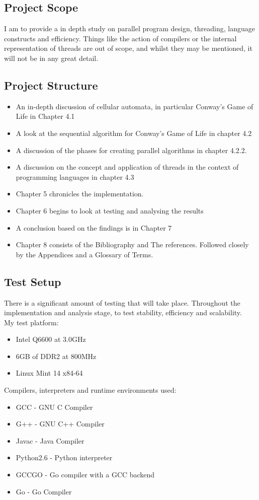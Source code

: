 \documentclass[11pt]{article} %
\begin{document}
\subsection{Project Scope}
I am to provide a in depth study on parallel program design, threading, language constructs and efficiency. Things like the action of compilers or the internal representation of threads are out of scope, and whilst they may be mentioned, it will not be in any great detail.
\subsection{Project Structure}
\begin{itemize}
\item An in-depth discussion of cellular automata, in particular Conway's Game of Life in Chapter 4.1
\item A look at the sequential algorithm for Conway's Game of Life in chapter 4.2
\item A discussion of the phases for creating parallel algorithms in chapter 4.2.2.
\item A discussion on the concept and application of threads in the context of programming languages in chapter 4.3
\item Chapter 5 chronicles the implementation.
\item Chapter 6 begins to look at testing and analysing the results
\item A conclusion based on the findings is in Chapter 7
\item Chapter 8 consists of the Bibliography and The references. Followed closely by the Appendices and a Glossary of Terms.
\end{itemize}
\subsection{Test Setup}
There is a significant amount of testing that will take place. Throughout the implementation and analysis stage, to test stability, efficiency and scalability.
\smallskip
\\My test platform:
\begin{itemize}
\item Intel Q6600 at 3.0GHz
\item 6GB of DDR2 at 800MHz
\item Linux Mint 14 x84-64
\end{itemize} 
Compilers, interpreters and runtime environments used:
\begin{itemize}
\item \gls{GCC} - GNU C Compiler
\item G++ - GNU C++ Compiler
\item Javac - Java Compiler 
\item Python2.6 - Python interpreter
\item GCCGO - Go compiler with a GCC backend
\item Go - Go Compiler
\end{itemize}
\end{document}
